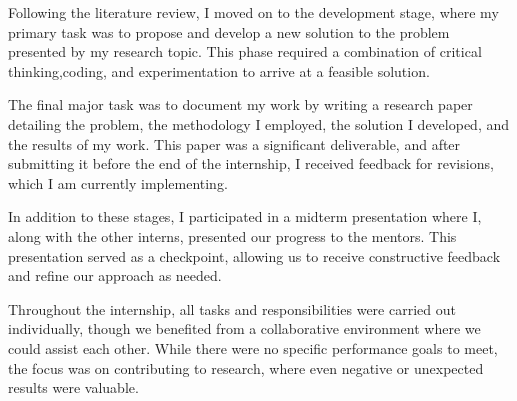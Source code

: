 Following the literature review, I moved on to the development stage, where my primary task was to propose and develop a
new solution to the problem presented by my research topic.
This phase required a combination of critical thinking,coding, and experimentation to arrive at a feasible solution.

The final major task was to document my work by writing a research paper detailing the problem, the methodology I
employed, the solution I developed, and the results of my work.
This paper was a significant deliverable, and after submitting it before the end of the internship, I received feedback
for revisions, which I am currently implementing.

In addition to these stages, I participated in a midterm presentation where I, along with the other interns, presented
our progress to the mentors.
This presentation served as a checkpoint, allowing us to receive constructive feedback and refine our approach as
needed.

Throughout the internship, all tasks and responsibilities were carried out individually, though we benefited from a
collaborative environment where we could assist each other.
While there were no specific performance goals to meet, the focus was on contributing to research, where even negative
or unexpected results were valuable.

